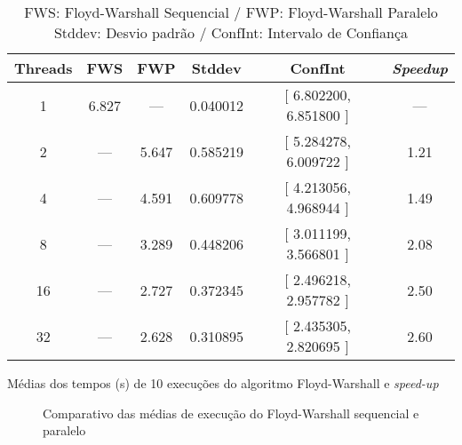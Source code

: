 \begin{table}[h]
\begin{center}
	\begin{tabular}{|c||c|c|c|c|c|} 
		\hline
		Threads & FWS & FWP & Stddev & ConfInt &\textit{Speedup} \\
		\hline

		1  & 6.827 & ---   & 0.040012 & [ 6.802200, 6.851800 ] & ---  \\
		2  & ---   & 5.647 & 0.585219 & [ 5.284278, 6.009722 ] & 1.21 \\
		4  & ---   & 4.591 & 0.609778 & [ 4.213056, 4.968944 ] & 1.49 \\
		8  & ---   & 3.289 & 0.448206 & [ 3.011199, 3.566801 ] & 2.08 \\
		16 & ---   & 2.727 & 0.372345 & [ 2.496218, 2.957782 ] & 2.50 \\
		32 & ---   & 2.628 & 0.310895 & [ 2.435305, 2.820695 ] & 2.60 \\
		
		\hline
	\end{tabular}
	\caption{Médias dos tempos (s) de 10 execuções do algoritmo Floyd-Warshall e \emph{speed-up}}
	\caption*{
		FWS: Floyd-Warshall Sequencial / FWP: Floyd-Warshall Paralelo\\
		Stddev: Desvio padrão / ConfInt: Intervalo de Confiança\\
	}
\end{center}
\end{table}

\begin{figure}[h]
\centering
{}
\caption{Comparativo das médias de execução do Floyd-Warshall sequencial e paralelo}
\end{figure}

